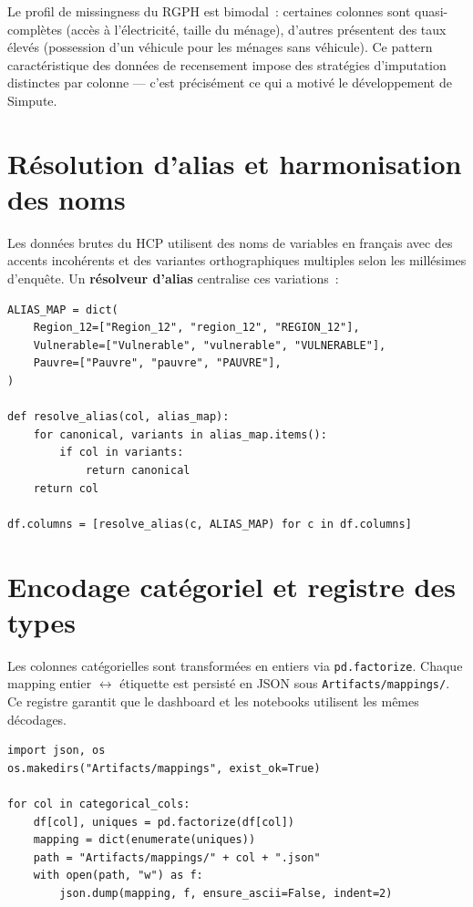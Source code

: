 \documentclass[12pt,a4paper]{report}
\begin{document}
Le profil de missingness du RGPH est bimodal~: certaines colonnes sont quasi-complètes (accès à l'électricité, taille du ménage), d'autres présentent des taux élevés (possession d'un véhicule pour les ménages sans véhicule). Ce pattern caractéristique des données de recensement impose des stratégies d'imputation distinctes par colonne --- c'est précisément ce qui a motivé le développement de Simpute.

\section{Résolution d'alias et harmonisation des noms}

Les données brutes du HCP utilisent des noms de variables en français avec des accents incohérents et des variantes orthographiques multiples selon les millésimes d'enquête. Un \textbf{résolveur d'alias} centralise ces variations~:

\begin{lstlisting}[caption={Resolution d'alias -- normalisation des noms de colonnes}]
ALIAS_MAP = dict(
    Region_12=["Region_12", "region_12", "REGION_12"],
    Vulnerable=["Vulnerable", "vulnerable", "VULNERABLE"],
    Pauvre=["Pauvre", "pauvre", "PAUVRE"],
)

def resolve_alias(col, alias_map):
    for canonical, variants in alias_map.items():
        if col in variants:
            return canonical
    return col

df.columns = [resolve_alias(c, ALIAS_MAP) for c in df.columns]
\end{lstlisting}

\section{Encodage catégoriel et registre des types}

Les colonnes catégorielles sont transformées en entiers via \texttt{pd.factorize}. Chaque mapping entier $\leftrightarrow$ étiquette est persisté en JSON sous \texttt{Artifacts/mappings/}. Ce registre garantit que le dashboard et les notebooks utilisent les mêmes décodages.

\begin{lstlisting}[caption={Encodage categoriel et persistance des mappings}]
import json, os
os.makedirs("Artifacts/mappings", exist_ok=True)

for col in categorical_cols:
    df[col], uniques = pd.factorize(df[col])
    mapping = dict(enumerate(uniques))
    path = "Artifacts/mappings/" + col + ".json"
    with open(path, "w") as f:
        json.dump(mapping, f, ensure_ascii=False, indent=2)
\end{lstlisting}
\end{document}
